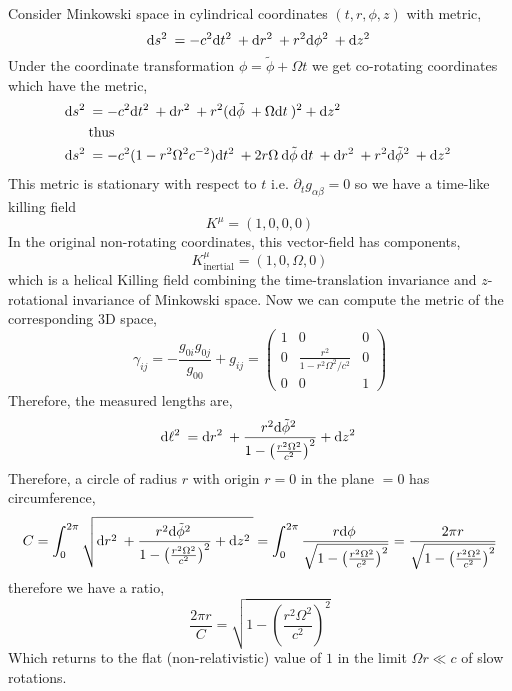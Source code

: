 \documentclass[12pt]{article}
\begin{document}
Consider Minkowski space in cylindrical coordinates $(t, r, \phi, z)$ with metric,
\[ \mathrm{d}s^2 \: = - c^2 \mathrm{d}t^2 \: + \mathrm{d}r^2 \: + r^2 \mathrm{d}\phi^2 \: + \mathrm{d}z^2 \: \]
Under the coordinate transformation $\phi = \tilde{\phi} + \Omega t$ we get co-rotating coordinates which have the metric,
\begin{align*}
\mathrm{d}s^2 \: & = - c^2 \mathrm{d}t^2 \: + \mathrm{d}r^2 \: + r^2 (\mathrm{d}\tilde{\phi} \: + \Omega \mathrm{d}t \:)^2 + \mathrm{d}z^2 \:
\\
& \text{thus}
\\
\mathrm{d}s^2 \: & = - c^2(1 - r^2 \Omega^2 c^{-2}) \mathrm{d}t^2 \: + 2 r \Omega \: \mathrm{d}\tilde{\phi} \: \mathrm{d}t \: + \mathrm{d}r^2 \: + r^2 \mathrm{d}\tilde{\phi}^2 \: + \mathrm{d}z^2 \:
\end{align*} 
This metric is stationary with respect to $t$ i.e. $\partial_t g_{\alpha \beta} = 0$ so we have a time-like killing field 
\[ K^\mu = (1, 0, 0, 0) \]
In the original non-rotating coordinates, this vector-field has components,
\[ K^\mu_{\text{inertial}} = (1, 0, \Omega, 0) \]
which is a helical Killing field combining the time-translation invariance and $z$-rotational invariance of Minkowski space. Now we can compute the metric of the corresponding 3D space, 
\[ \gamma_{ij} = - \frac{g_{0i} g_{0j}}{g_{00}} + g_{ij} = 
\begin{pmatrix}
1 & 0 & 0 
\\
0 & \frac{r^2}{1 - r^2 \Omega^2 / c^2} & 0 
\\
0 & 0 & 1
\end{pmatrix} \]
Therefore, the measured lengths are,
\[ \mathrm{d}\ell^2 \: = \mathrm{d}r^2 \: + \frac{r^2 \mathrm{d}\tilde{\phi}^2 \:}{1 - \left( \frac{r^2 \Omega^2}{c^2} \right)^2} + \mathrm{d}z^2 \: \]
Therefore, a circle of radius $r$ with origin $r = 0$ in the plane $ = 0$ has circumference,
\[ C = \int_0^{2 \pi} \sqrt{\mathrm{d}r^2 \: + \frac{r^2 \mathrm{d}\tilde{\phi}^2 \:}{1 - \left( \frac{r^2 \Omega^2}{c^2} \right)^2} + \mathrm{d}z^2 \:} = \int_0^{2\pi} \frac{r \mathrm{d}\phi \:}{\sqrt{1 - \left( \frac{r^2 \Omega^2}{c^2} \right)^2}} = \frac{2 \pi r}{\sqrt{1 - \left( \frac{r^2 \Omega^2}{c^2} \right)^2}} \]
therefore we have a ratio,
\[ \frac{2 \pi r}{C} = \sqrt{1 - \left( \frac{r^2 \Omega^2}{c^2} \right)^2} \]
Which returns to the flat (non-relativistic) value of $1$ in the limit $\Omega r \ll c$ of slow rotations.  
\end{document}
